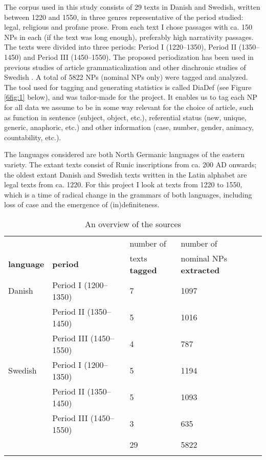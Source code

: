 \documentclass[output=paper]{langsci/langscibook}
\begin{document}
The corpus used in this study consists of 29 texts in Danish and Swedish, written between 1220 and 1550, in three genres representative of the period studied: legal, religious and profane prose. From each text I chose passages with ca. 150 NPs in each (if the text was long enough), preferably high narrativity passages. The texts were divided into three periods: Period I (1220--1350), Period II (1350--1450) and Period III (1450--1550). The proposed periodization has been used in previous studies of article grammaticalization and other diachronic studies of Swedish \citep{delsing:12}. A total of 5822 NPs (nominal NPs only) were tagged and analyzed. The tool used for tagging and generating statistics is called DiaDef (see Figure \ref{6fig:1} below), and was tailor-made for the project. It enables us to tag each NP for all data we assume to be in some way relevant for the choice of article, such as function in sentence (subject, object, etc.), referential status (new, unique, generic, anaphoric, etc.) and other information (case, number, gender, animacy, countability, etc.). 

The languages considered are both North Germanic languages of the eastern variety. The extant texts consist of Runic inscriptions from ca. 200 AD onwards; the oldest extant Danish and Swedish texts written in the Latin alphabet are legal texts from ca. 1220. For this project I look at texts from 1220 to 1550, which is a time of radical change in the grammars of both languages, including loss of case and the emergence of (in)definiteness. 

\begin{table}[H]
\centering
\begin{tabular}{llll}
\lsptoprule
  &   & number of & number of  \\
{\bf{language}} & {\bf{period}} & texts {\bf{tagged}} & nominal NPs {\bf{extracted}} \\
\midrule
Danish 	& Period I (1200–1350)	& 7	& 1097 \\ 
		& Period II (1350–1450)	& 5	& 1016 \\ 
		& Period III (1450–1550)	& 4	& 787 \\[2mm] 
Swedish	& Period I (1200–1350)	& 5	& 1194 \\ 
		& Period II (1350–1450)	& 5	& 1093 \\ 
		& Period III (1450–1550)	& 3	& 635 \\[2mm] 
\midrule
		& 				& 29	& 5822 \\
\lspbottomrule
\end{tabular}
\caption{An overview of the sources}\label{6table:1}
\end{table}
\end{document}
